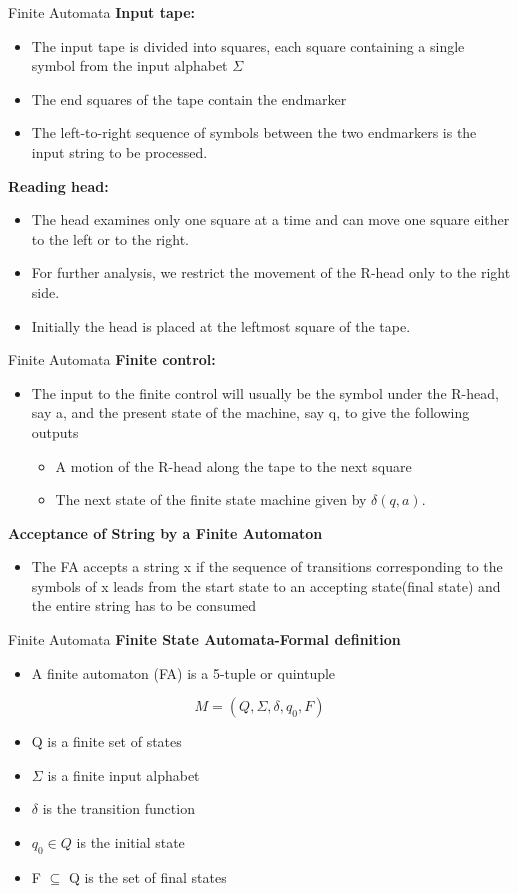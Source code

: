 \documentclass{beamer}
\begin{document}
\begin{frame}{Finite Automata}
\textbf{Input tape: }
\begin{itemize}
	\item The input tape is divided into squares, each square containing a single 
	symbol from the input alphabet $\Sigma$
	\item The end squares of the tape contain the endmarker 
	\item The left-to-right sequence of symbols between the two endmarkers is the 
	input string to be processed. 
\end{itemize}
\textbf{Reading head: }
\begin{itemize}
	\item  The head examines only one square at a time and can move one square either to the left or to the right.
	\item For further analysis, we restrict the movement of the R-head only to the right side.
	\item Initially the head is placed at the leftmost square of the tape.
\end{itemize}
\end{frame}
\begin{frame}{Finite Automata}
	\textbf{Finite control: }
	\begin{itemize}
		\item The input to the finite control will usually be the symbol 
		under the R-head, say a, and the present state of the machine, say q, to give 
		the following outputs
		\begin{itemize}
			\item A motion of the R-head along the tape to the next square
			\item The next state of the finite state machine given by $\delta(q, a)$.
		\end{itemize}
	\end{itemize}
\textbf{Acceptance of String by a Finite Automaton}
\begin{itemize}
	\item The FA accepts a string x if the sequence of transitions corresponding to the 
	symbols of x leads from the start state to an accepting state(final state) and the entire 
	string has to be consumed
\end{itemize}
\end{frame}
\begin{frame}{Finite Automata}
	\textbf{Finite State Automata-Formal definition }
	\begin{itemize}
		\item A finite automaton (FA) is a 5-tuple or quintuple 
	\end{itemize}
$$M=(Q,\Sigma,\delta,q_0,F)$$
	\begin{itemize}
	\item Q is a finite set of states
	\item $\Sigma$ is a finite input alphabet
	\item $\delta$ is the transition function
	\item $q_0 \in Q$ is the initial state
	\item F $\subseteq$ Q is the set of final states
\end{itemize}
\end{frame}
\end{document}
